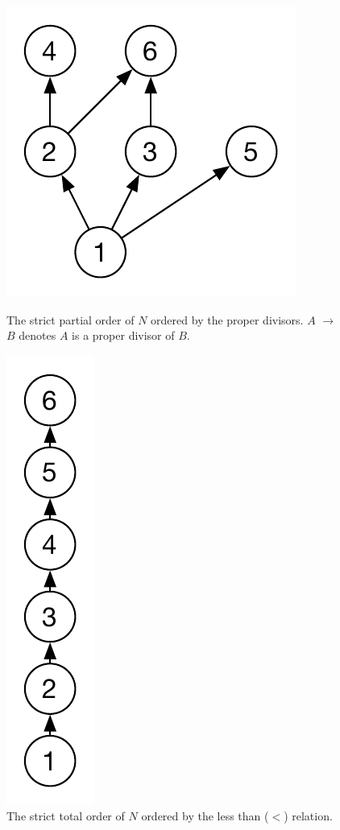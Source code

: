 		\begin{figure}[H]
		\centering
		\begin{minipage}{0.45\textwidth}
			\centering
			\includegraphics[height=\textheight/5]{2background/images/strict-partial.pdf}
		\caption{The strict partial order of $N$ ordered by the proper divisors. $A$ $\rightarrow$ $B$ denotes $A$ is a proper divisor of $B$.}
		\label{fig:background:strict-partial}
		\end{minipage}\hfill
		\begin{minipage}{0.45\textwidth}
			\centering
			\includegraphics[height=\textheight/5]{2background/images/strict-total.pdf}
		\caption{The strict total order of $N$ ordered by the less than ($<$) relation.}
		\label{fig:background:strict-total}
		\end{minipage}
		\end{figure}
		
